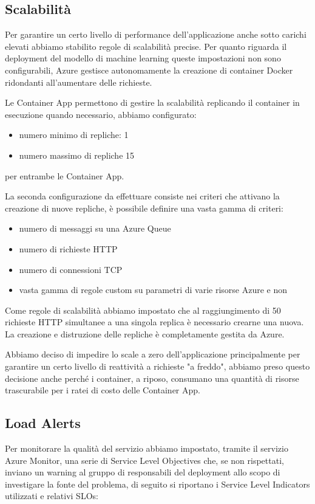 \subsection{Scalabilità}
Per garantire un certo livello di performance dell'applicazione anche sotto carichi elevati abbiamo stabilito regole di scalabilità precise. Per quanto riguarda il deployment del modello di machine learning queste impostazioni non sono configurabili, Azure gestisce autonomamente la creazione di container Docker ridondanti all'aumentare delle richieste.

Le Container App permettono di gestire la scalabilità replicando il container in esecuzione quando necessario, abbiamo configurato:
\begin{itemize}
    \item numero minimo di repliche: 1
    \item numero massimo di repliche 15
\end{itemize}
per entrambe le Container App.

La seconda configurazione da effettuare consiste nei criteri che attivano la creazione di nuove repliche, è possibile definire una vasta gamma di criteri:
\begin{itemize}
    \item numero di messaggi su una Azure Queue
    \item numero di richieste HTTP
    \item numero di connessioni TCP
    \item vasta gamma di regole custom su parametri di varie risorse Azure e non
\end{itemize}

Come regole di scalabilità abbiamo impostato che al raggiungimento di 50 richieste HTTP simultanee a una singola replica è necessario crearne una nuova. La creazione e distruzione delle repliche è completamente gestita da Azure.

Abbiamo deciso di impedire lo scale a zero dell'applicazione principalmente per garantire un certo livello di reattività a richieste "a freddo", abbiamo preso questo decisione anche perché i container, a riposo, consumano una quantità di risorse trascurabile per i ratei di costo delle Container App.

\subsection{Load Alerts}
Per monitorare la qualità del servizio abbiamo impostato, tramite il servizio Azure Monitor, una serie di Service Level Objectives che, se non rispettati, inviano un warning al gruppo di responsabili del deployment allo scopo di investigare la fonte del problema, di seguito si riportano i Service Level Indicators utilizzati e relativi SLOs:

